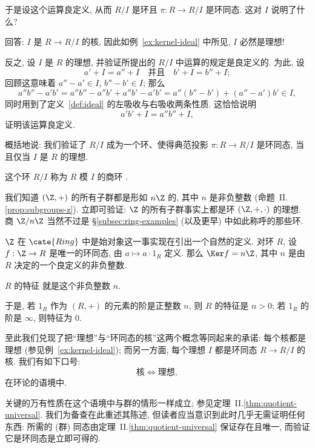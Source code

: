 于是设这个运算良定义, 从而 $R/I$ 是环且 $\pi : R \to R/I$ 是环同态. 这对 $I$ 说明了什么?

回答: $I$ 是 $R \to R/I$ 的核, 因此如例~\ref{ex:kernel-ideal} 中所见, $I$ 必然是理想!

反之, 设 $I$ 是 $R$ 的理想, 并验证所提出的 $R/I$ 中运算的规定是良定义的. 为此, 设
\[
a' + I = a'' + I \quad \text{并且} \quad b' + I = b'' + I;
\]
回顾这意味着 $a'' - a' \in I$, $b'' - b' \in I$; 那么
\[
a'' b'' - a' b' = a'' b'' - a'' b' + a'' b' - a' b' = a''(b'' - b') + (a'' - a') b' \in I,
\]
同时用到了定义~\ref{def:ideal} 的左吸收与右吸收两条性质. 这恰恰说明
\[
a' b' + I = a'' b'' + I,
\]
证明该运算良定义.

概括地说: 我们验证了 $R/I$ 成为一个环、使得典范投影 $\pi : R \to R/I$ 是环同态, 当且仅当 $I$ 是 $R$ 的理想.

\begin{definition}
\label{def:quotient-ring}
这个环 $R/I$ 称为 $R$ 模 $I$ 的商环%
.
\end{definition}

\begin{example}
\label{ex:zn-ideals}
我们知道 $(\Z, +)$ 的所有子群都是形如 $n\Z$ 的, 其中 $n$ 是非负整数 (命题~II.\ref{prop:subgroups-z}). 立即可验证: $\Z$ 的所有子群事实上都是环 $(\Z, +, \cdot)$ 的理想. 商 $\Z/n\Z$ 当然不过是 \S\ref{subsec:ring-examples} (以及更早) 中如此称呼的那些环.
\end{example}

$\Z$ 在 $\cate{Ring}$ 中是始对象这一事实现在引出一个自然的定义. 对环 $R$, 设 $f : \Z \to R$ 是唯一的环同态, 由 $a \mapsto a \cdot 1_R$ 定义. 那么 $\Ker f = n\Z$, 其中 $n$ 是由 $R$ 决定的一个良定义的非负整数.

\begin{definition}
\label{def:characteristic}
$R$ 的特征%
就是这个非负整数 $n$.
\end{definition}

于是, 若 $1_R$ 作为 $(R, +)$ 的元素的阶是正整数 $n$, 则 $R$ 的特征是 $n > 0$; 若 $1_R$ 的阶是 $\infty$, 则特征为 $0$.

至此我们兑现了把``理想''与``环同态的核''这两个概念等同起来的承诺: 每个核都是理想 (参见例~\ref{ex:kernel-ideal}); 而另一方面, 每个理想 $I$ 都是环同态 $R \rightarrow R/I$ 的核. 我们有如下口号:
\[
\text{核} \iff \text{理想},
\]
在环论的语境中.

关键的万有性质在这个语境中与群的情形一样成立; 参见定理~II.\ref{thm:quotient-universal}. 我们为备查在此重述其陈述, 但读者应当意识到此时几乎无需证明任何东西: 所需的 (群) 同态由定理~II.\ref{thm:quotient-universal} 保证存在且唯一, 而验证它是环同态是立即可得的.

